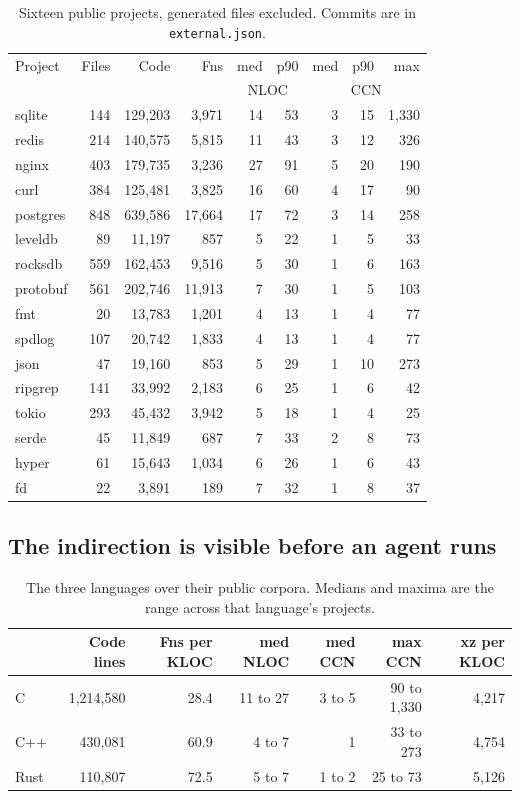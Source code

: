 \documentclass[11pt,a4paper]{article}
\begin{document}
\begin{table}[H]
\centering
\small
\begin{tabular}{lrrrrrrrr}
\toprule
Project & Files & Code & Fns & med & p90 & med & p90 & max \\
& & & & \multicolumn{2}{c}{NLOC} & \multicolumn{3}{c}{CCN} \\
\midrule
sqlite & 144 & 129,203 & 3,971 & 14 & 53 & 3 & 15 & 1,330 \\
redis & 214 & 140,575 & 5,815 & 11 & 43 & 3 & 12 & 326 \\
nginx & 403 & 179,735 & 3,236 & 27 & 91 & 5 & 20 & 190 \\
curl & 384 & 125,481 & 3,825 & 16 & 60 & 4 & 17 & 90 \\
postgres & 848 & 639,586 & 17,664 & 17 & 72 & 3 & 14 & 258 \\
\addlinespace
leveldb & 89 & 11,197 & 857 & 5 & 22 & 1 & 5 & 33 \\
rocksdb & 559 & 162,453 & 9,516 & 5 & 30 & 1 & 6 & 163 \\
protobuf & 561 & 202,746 & 11,913 & 7 & 30 & 1 & 5 & 103 \\
fmt & 20 & 13,783 & 1,201 & 4 & 13 & 1 & 4 & 77 \\
spdlog & 107 & 20,742 & 1,833 & 4 & 13 & 1 & 4 & 77 \\
json & 47 & 19,160 & 853 & 5 & 29 & 1 & 10 & 273 \\
\addlinespace
ripgrep & 141 & 33,992 & 2,183 & 6 & 25 & 1 & 6 & 42 \\
tokio & 293 & 45,432 & 3,942 & 5 & 18 & 1 & 4 & 25 \\
serde & 45 & 11,849 & 687 & 7 & 33 & 2 & 8 & 73 \\
hyper & 61 & 15,643 & 1,034 & 6 & 26 & 1 & 6 & 43 \\
fd & 22 & 3,891 & 189 & 7 & 32 & 1 & 8 & 37 \\
\bottomrule
\end{tabular}
\caption{Sixteen public projects, generated files excluded. Commits are in \texttt{external.json}.}
\label{tab:external}
\end{table}

\subsection{The indirection is visible before an agent runs}

\begin{table}[H]
\centering
\small
\begin{tabular}{lrrrrrr}
\toprule
& Code lines & Fns per KLOC & med NLOC & med CCN & max CCN & xz per KLOC \\
\midrule
C & 1,214,580 & 28.4 & 11 to 27 & 3 to 5 & 90 to 1,330 & 4,217 \\
C++ & 430,081 & 60.9 & 4 to 7 & 1 & 33 to 273 & 4,754 \\
Rust & 110,807 & 72.5 & 5 to 7 & 1 to 2 & 25 to 73 & 5,126 \\
\bottomrule
\end{tabular}
\caption{The three languages over their public corpora. Medians and maxima are the range across that language's projects.}
\label{tab:three}
\end{table}
\end{document}
